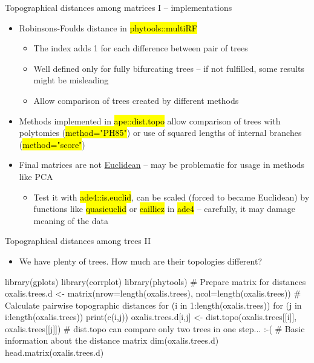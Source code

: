 \documentclass[compress, ucs, xelatex, 11pt, xcolor=svgnames,
  hyperref={
    bookmarks=true,
    unicode=true,
    colorlinks=true,
    pdftitle={Molecular data in R},
    plainpages=false,
    pdfauthor={Vojtech Zeisek},
    pdfsubject={Course about phylogeny and evolution in R},
    pdfcreator={XeLaTeX},
    pdfkeywords={R, evolution, phylogeny, molecular data},
    linkcolor=Tomato,
    anchorcolor=SaddleBrown,
    citecolor=Goldenrod,
    filecolor=DarkMagenta,
    menucolor=Sienna,
    urlcolor=DarkTurquoise,
    pdftex},
  url={hyphens, lowtilde} %
  ]{beamer}
\renewcommand{\texttt}[1]{\hl{\ttfamily #1}}
\begin{document}
\begin{frame}{Topographical distances among matrices I -- implementations}
\begin{itemize}
  \item Robinsons-Foulds distance in \texttt{phytools::multiRF}
  \begin{itemize}
    \item The index adds 1 for each difference between pair of trees
    \item Well defined only for fully bifurcating trees -- if not fulfilled, some results might be misleading
    \item Allow comparison of trees created by different methods
  \end{itemize}
  \item Methods implemented in \texttt{ape::dist.topo} allow comparison of trees with polytomies (\texttt{method="PH85"}) or use of squared lengths of internal branches (\texttt{method="score"})
  \item Final matrices are not \href{https://en.wikipedia.org/wiki/Euclidean_distance_matrix}{Euclidean} -- may be problematic for usage in methods like PCA
  \begin{itemize}
    \item Test it with \texttt{ade4::is.euclid}, can be scaled (forced to became Euclidean) by functions like \texttt{quasieuclid} or \texttt{cailliez} in \texttt{ade4} -- carefully, it may damage meaning of the data
  \end{itemize}
\end{itemize}
\end{frame}

\begin{frame}[fragile]{Topographical distances among trees II}
  \begin{itemize}
    \item We have plenty of trees. How much are their topologies different?
  \end{itemize}
  \begin{spluscode}
    library(gplots)
    library(corrplot)
    library(phytools)
    # Prepare matrix for distances
    oxalis.trees.d <- matrix(nrow=length(oxalis.trees),
      ncol=length(oxalis.trees))
    # Calculate pairwise topographic distances
    for (i in 1:length(oxalis.trees)) {
      for (j in i:length(oxalis.trees)) {
        print(c(i,j))
        oxalis.trees.d[i,j] <- dist.topo(oxalis.trees[[i]],
          oxalis.trees[[j]])
      }
    } # dist.topo can compare only two trees in one step... :-(
    # Basic information about the distance matrix
    dim(oxalis.trees.d)
    head.matrix(oxalis.trees.d)
  \end{spluscode}
\end{frame}
\end{document}
